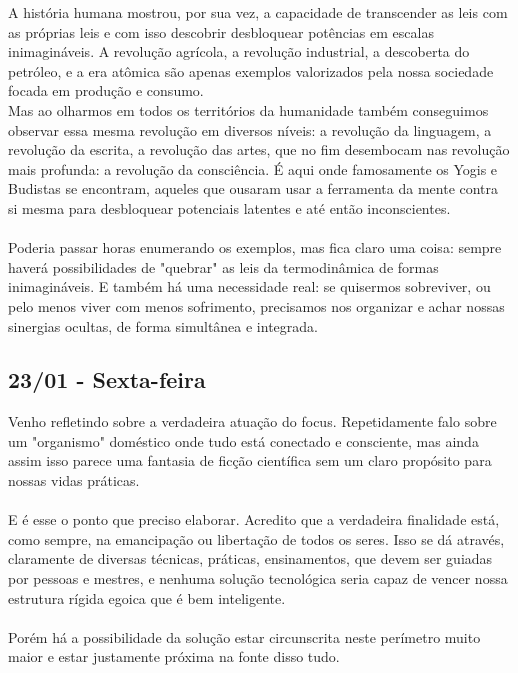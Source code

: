 \documentclass[11pt]{article}
\begin{document}
A história humana mostrou, por sua vez, a capacidade de transcender as leis com as próprias leis e com isso descobrir desbloquear potências em escalas inimagináveis. A revolução agrícola, a revolução industrial, a descoberta do petróleo, e a era atômica são apenas exemplos valorizados pela nossa sociedade focada em produção e consumo.\\


Mas ao olharmos em todos os territórios da humanidade também conseguimos observar essa mesma revolução em diversos níveis: a revolução da linguagem, a revolução da escrita, a revolução das artes, que no fim desembocam nas revolução mais profunda: a revolução da consciência. É aqui onde famosamente os Yogis e Budistas se encontram, aqueles que ousaram usar a ferramenta da mente contra si mesma para desbloquear potenciais latentes e até então inconscientes.\\\\

Poderia passar horas enumerando os exemplos, mas fica claro uma coisa: sempre haverá possibilidades de "quebrar" as leis da termodinâmica de formas inimagináveis. E também há uma necessidade real: se quisermos sobreviver, ou pelo menos viver com menos sofrimento, precisamos nos organizar e achar nossas sinergias ocultas, de forma simultânea e integrada.

\subsection{23/01 - Sexta-feira}

Venho refletindo sobre a verdadeira atuação do focus. Repetidamente falo sobre um "organismo" doméstico onde tudo está conectado e consciente, mas ainda assim isso parece uma fantasia de ficção científica sem um claro propósito para nossas vidas práticas.\\\\

E é esse o ponto que preciso elaborar. Acredito que a verdadeira finalidade está, como sempre, na emancipação ou libertação de todos os seres. Isso se dá através, claramente de diversas técnicas, práticas, ensinamentos, que devem ser guiadas por pessoas e mestres, e nenhuma solução tecnológica seria capaz de vencer nossa estrutura rígida egoica que é bem inteligente.\\\\

Porém há a possibilidade da solução estar circunscrita neste perímetro muito maior e estar justamente próxima na fonte disso tudo.\\\\
\end{document}
